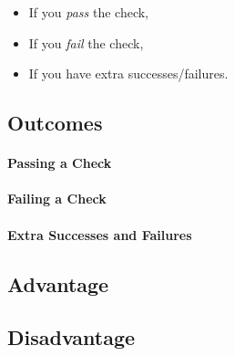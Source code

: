 \documentclass[../main.tex]{subfiles}
\begin{document}
    \begin{itemize}
        \item If you {\em pass} the check,
        \item If you {\em fail} the check,
        \item If you have extra successes/failures.
    \end{itemize}

    \pagebreak

    \subsection{Outcomes}

    \paragraph{Passing a Check}

    \paragraph{Failing a Check}

    \paragraph{Extra Successes and Failures}
    
    \subsection{Advantage}

    \subsection{Disadvantage}
\end{document}
